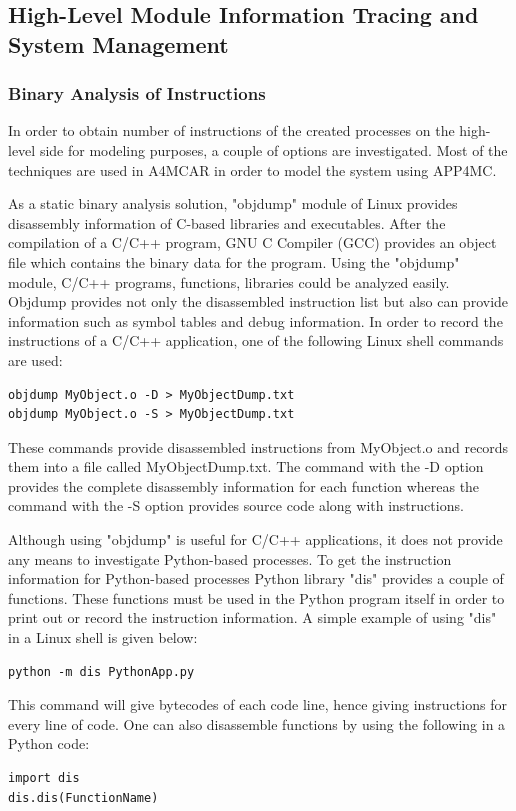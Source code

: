 \subsection{High-Level Module Information Tracing and System Management}

\subsubsection{Binary Analysis of Instructions}
In order to obtain number of instructions of the created processes on the high-level side for modeling purposes, a couple of options are investigated. Most of the techniques are used in A4MCAR in order to model the system using APP4MC.

As a static binary analysis solution, "objdump" \cite{objdump} module of Linux provides disassembly information of C-based libraries and executables. After the compilation of a C/C++ program, GNU C Compiler (GCC) provides an object file which contains the binary data for the program. Using the "objdump" module, C/C++ programs, functions, libraries could be analyzed easily. Objdump provides not only the disassembled instruction list but also can provide information such as symbol tables and debug information. In order to record the instructions of a C/C++ application, one of the following Linux shell commands are used:
\begin{lstlisting}
objdump MyObject.o -D > MyObjectDump.txt
objdump MyObject.o -S > MyObjectDump.txt
\end{lstlisting}
These commands provide disassembled instructions from MyObject.o and records them into a file called MyObjectDump.txt. The command with the -D option provides the complete disassembly information for each function whereas the command with the -S option provides source code along with instructions. 

Although using "objdump" is useful for C/C++ applications, it does not provide any means to investigate Python-based processes. To get the instruction information for Python-based processes Python library "dis" \cite{dis} provides a couple of functions. These functions must be used in the Python program itself in order to print out or record the instruction information. A simple example of using "dis" in a Linux shell is given below:
\begin{lstlisting}
python -m dis PythonApp.py
\end{lstlisting}
This command will give bytecodes of each code line, hence giving instructions for every line of code. One can also disassemble functions by using the following in a Python code:
\begin{lstlisting}
import dis
dis.dis(FunctionName)
\end{lstlisting}

